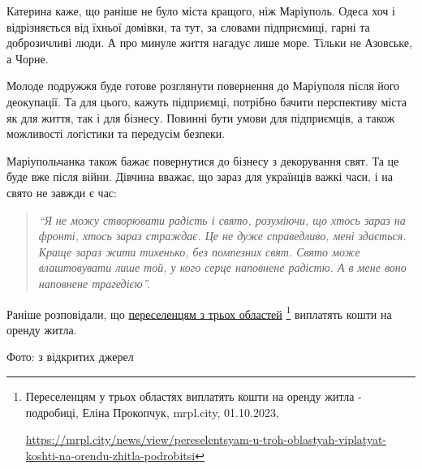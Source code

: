 Катерина каже, що раніше не було міста кращого, ніж Маріуполь. Одеса хоч і
відрізняється від їхньої домівки, та тут, за словами підприємиці, гарні та
доброзичливі люди. А про минуле життя нагадує лише море. Тільки не Азовське, а
Чорне.

Молоде подружжя буде готове розглянути повернення до Маріуполя після його
деокупації. Та для цього, кажуть підприємці, потрібно бачити перспективу міста
як для життя, так і для бізнесу. Повинні бути умови для підприємців, а також
можливості логістики та передусім безпеки.

Маріупольчанка також бажає повернутися до бізнесу з декорування свят. Та це
буде вже після війни. Дівчина вважає, що зараз для українців важкі часи, і на
свято не завжди є час:

\begin{quote}
\em\enquote{Я не можу створювати радість і свято, розуміючи, що хтось зараз на фронті,
хтось зараз страждає. Це не дуже справедливо, мені здається. Краще зараз жити
тихенько, без помпезних свят. Свято може влаштовувати лише той, у кого серце
наповнене радістю. А в мене воно наповнене трагедією}.
\end{quote}


Раніше розповідали, що \href{https://mrpl.city/news/view/pereselentsyam-u-troh-oblastyah-viplatyat-koshti-na-orendu-zhitla-podrobitsi}{%
переселенцям з трьох областей}%
\footnote{Переселенцям у трьох областях виплатять кошти на оренду житла - подробиці, Еліна Прокопчук, mrpl.city, 01.10.2023, \par%
\url{https://mrpl.city/news/view/pereselentsyam-u-troh-oblastyah-viplatyat-koshti-na-orendu-zhitla-podrobitsi}}
виплатять кошти на оренду житла.  

Фото: з відкритих джерел
